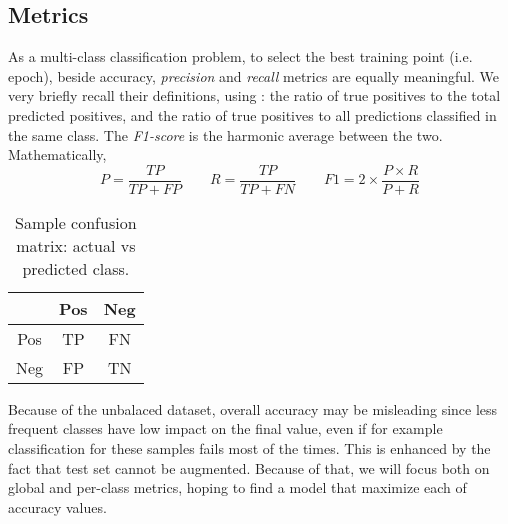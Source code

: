 \subsection{Metrics}\label{ssec:metrics}

As a multi-class classification problem, to select the best training point (i.e. epoch), beside accuracy, \textit{precision} and \textit{recall} metrics are equally meaningful.
We very briefly recall their definitions, using : the ratio of true positives to the total predicted positives, and the ratio of true positives to all predictions classified in the same class.
The \textit{F1-score} is the harmonic average between the two.
Mathematically,
\[ P = \frac{TP}{TP+FP} \qquad R = \frac{TP}{TP+FN} \qquad F1 = 2 \times \frac{P\times R}{P+R} \]

\begin{table}[ht]
    \centering
    \caption{Sample confusion matrix: actual vs predicted class.}
    \label{tab:class_mat}
    \begin{tabular}{c|cc}\toprule
        & Pos & Neg \\\midrule
    Pos & TP  & FN  \\
    Neg & FP  & TN  \\\bottomrule
    \end{tabular}
\end{table}


Because of the unbalaced dataset, overall accuracy may be misleading since less frequent classes have low impact on the final value, even if for example classification for these samples fails most of the times.
This is enhanced by the fact that test set cannot be augmented.
Because of that, we will focus both on global and per-class metrics, hoping to find a model that maximize each of accuracy values. %

